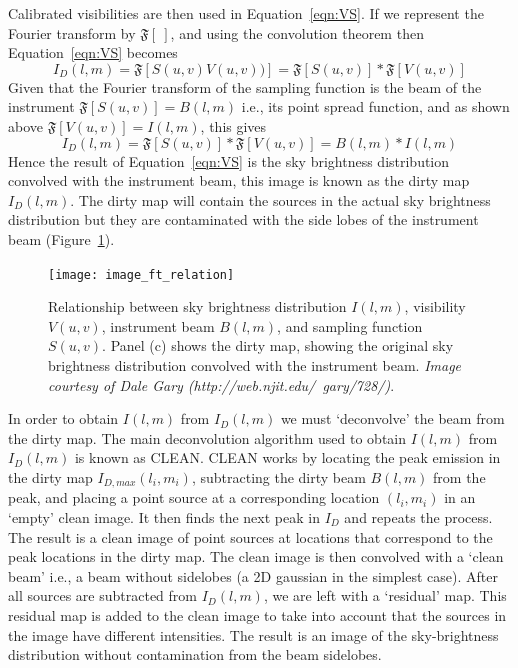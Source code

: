 Calibrated visibilities are then used in Equation~\ref{eqn:VS}. If we represent the Fourier transform by $\mathfrak{F}[~]$, and using the convolution theorem then Equation~\ref{eqn:VS} becomes
\begin{equation}
I_D(l,m)=\mathfrak{F}[S(u,v)V(u,v))] = \mathfrak{F}[S(u,v)]\ast\mathfrak{F}[V(u,v)]
\label{eqn:VS2}
\end{equation}
Given that the Fourier transform of the sampling function is the beam of the instrument $\mathfrak{F}[S(u,v)] = B(l,m)$ i.e., its point spread function, and as shown above $\mathfrak{F}[V(u,v)] = I(l,m)$, this gives
\begin{equation}
I_D(l,m) = \mathfrak{F}[S(u,v)]\ast\mathfrak{F}[V(u,v)] = B(l,m) \ast I(l,m)
\label{eqn:convol}
\end{equation}
Hence the result of Equation~\ref{eqn:VS} is the sky brightness distribution convolved with the instrument beam, this image is known as the dirty map $I_D(l,m)$. The dirty map will contain the sources in the actual sky brightness distribution but they are contaminated with the side lobes of the instrument beam (Figure~\ref{fig:IVSB}). 
\begin{figure}[!t]
\begin{center}
\texttt{[image: image\_ft\_relation]}
\caption[Sky brightness, visibility, beam, and sampling function]{Relationship between sky brightness distribution $I(l,m)$, visibility $V(u,v)$, instrument beam $B(l,m)$, and sampling function $S(u,v)$. Panel (c) shows the dirty map, showing the original sky brightness distribution convolved with the instrument beam. {\it Image courtesy of Dale Gary (http://web.njit.edu/~gary/728/)}.}
\label{fig:IVSB}
\end{center}
\end{figure}
In order to obtain $I(l,m)$ from $I_D(l,m)$ we must `deconvolve' the beam from the dirty map. The main deconvolution algorithm used to obtain $I(l,m)$ from $I_D(l,m)$ is known as CLEAN. CLEAN works by locating the peak emission in the dirty map $I_{D, max}(l_i,m_i)$, subtracting the dirty beam $B(l,m)$ from the peak, and placing a point source at a corresponding location $(l_i,m_i)$ in an `empty' clean image. It then finds the next peak in $I_D$ and repeats the process. The result is a clean image of point sources at locations that correspond to the peak locations in the dirty map. The clean image is then convolved with a `clean beam' i.e., a beam without sidelobes (a 2D gaussian in the simplest case). After all sources are subtracted from $I_D(l,m)$, we are left with a `residual' map. This residual map is added to the clean image to take into account that the sources in the image have different intensities. The result is an image of the sky-brightness distribution without contamination from the beam sidelobes.


